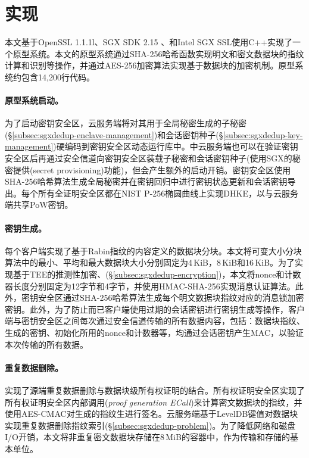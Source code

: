 \section{\sysnameS 实现}
\label{sec:sgxdedup-implementation}

本文基于OpenSSL 1.1.1l\cite{openssl}、SGX SDK 2.15\cite{sgxsdk} 、和Intel SGX SSL\cite{sgxssl}使用C++实现了一个\sysnameS 原型系统。本文的原型系统通过SHA-256哈希函数实现明文和密文数据块的指纹计算和识别等操作，并通过AES-256加密算法实现基于数据块的加密机制。原型系统约包含14,200行代码。

\paragraph*{原型系统启动。}
为了启动密钥安全区，云服务端将对其用于全局秘密生成的子秘密(\S\ref{subsec:sgxdedup-enclave-management})和会话密钥种子(\S\ref{subsec:sgxdedup-key-management})硬编码到密钥安全区动态运行库中。\sysnameS 中云服务端也可以在验证密钥安全区后再通过安全信道向密钥安全区装载子秘密和会话密钥种子(使用SGX\cite{sgx}的秘密提供(secret provisioning)功能)，但会产生额外的启动开销。密钥安全区使用SHA-256哈希算法生成全局秘密并在密钥回归中进行密钥状态更新和会话密钥导出。每个所有全证明安全区都在NIST P-256椭圆曲线\cite{nist}上实现DHKE，以与云服务端共享PoW密钥。

\paragraph*{密钥生成。}每个客户端实现了基于Rabin指纹\cite{rabin81}的内容定义的数据块分块。本文将可变大小分块算法中的最小、平均和最大数据块大小分别固定为4\,KiB，8\,KiB和16\,KiB。为了实现基于TEE的推测性加密、(\S\ref{subsec:sgxdedup-encryption})，本文将nonce和计数器长度分别固定为12字节和4字节，并使用HMAC-SHA-256实现消息认证算法。此外，密钥安全区通过SHA-256哈希算法生成每个明文数据块指纹对应的消息锁加密密钥。此外，为了防止而已客户端使用过期的会话密钥进行密钥生成等操作，客户端与密钥安全区之间每次通过安全信道传输的所有数据内容，包括：数据块指纹、生成的密钥、初始化所用的nonce和计数器等，均通过会话密钥产生MAC，以验证本次传输的所有数据。

\paragraph*{重复数据删除。}\sysnameS 实现了源端重复数据删除与数据块级所有权证明的结合。所有权证明安全区实现了所有权证明安全区内部调用(\textit{proof generation ECall})来计算密文数据块的指纹，并使用AES-CMAC对生成的指纹生进行签名。云服务端基于LevelDB\cite{leveldb}键值对数据块实现重复数据删除指纹索引(\S\ref{subsec:sgxdedup-problem})。为了降低网络和磁盘I/O开销，本文将非重复密文数据块存储在8\,MiB的容器中，作为传输和存储的基本单位\cite{lillibridge13}。

